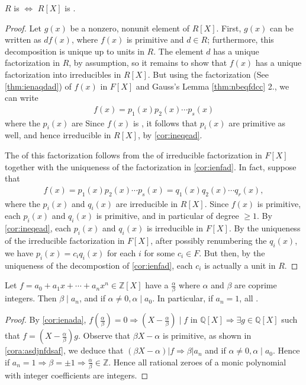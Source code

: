 \documentclass{article}
\begin{document}
\begin{thma}\label{thm:omeqdz}
$R$ is  $\Longleftrightarrow$ $R[X]$ is  .
\end{thma}
\begin{proof}
Let $g(x)$ be a nonzero, nonunit element of $R[X]$. First, $g(x)$ can be written as $d f(x)$, where $f(x)$ is primitive and $d \in R$; furthermore, this decomposition is unique up to units in $R$. The element $d$ has a unique factorization in $R$, by assumption, so it remains to show that $f(x)$ has a unique factorization into irreducibles in $R[X]$. But using the factorization (See \cref{thm:ienaqdad}) of $f(x)$ in $F[X]$ and Gauss's Lemma \cref{thm:nbeqfdcc} 2., we can write
\begin{align*}
f(x)=p_{1}(x) p_{2}(x) \cdots p_{s}(x)
\end{align*}
where the $p_{i}(x)$ are  Since $f(x)$ is , it follows that $p_{i}(x)$ are primitive as well, and hence irreducible in $R[X]$, by \cref{cor:ineqead}.

The  of this factorization follows from the  of irreducible factorization in $F[X]$ together with the uniqueness of the factorization in \cref{cor:ienfad}. In fact, suppose that
\begin{align*}
f(x)=p_{1}(x) p_{2}(x) \cdots p_{s}(x)=q_{1}(x) q_{2}(x) \cdots q_{r}(x),
\end{align*}
where the $p_{i}(x)$ and $q_{i}(x)$ are irreducible in $R[X]$. Since $f(x)$ is primitive, each $p_{i}(x)$ and $q_{i}(x)$ is primitive, and in particular of degree $\geq 1$. By \cref{cor:ineqead}, each $p_{i}(x)$ and $q_{i}(x)$ is irreducible in $F[X]$. By the uniqueness of the irreducible factorization in $F[X]$, after possibly renumbering the $q_{i}(x)$, we have $p_{i}(x)=c_{i} q_{i}(x)$ for each $i$ for some $c_{i} \in F$. But then, by the uniqueness of the decompostion of  \cref{cor:ienfad}, each $c_{i}$ is actually a unit in $R$.
\end{proof}

\begin{cora}\label{cor:ndaccd}
Let $f=a_{0}+a_{1} x+\cdots+a_{n} x^{n} \in \mathbb{Z}[X]$ have a  $\frac{\alpha}{\beta}$ where $\alpha$ and $\beta$ are coprime integers. Then $\beta \mid a_{n}$, and if $\alpha \neq 0, \alpha \mid a_{0}$. In particular, if $a_{n}=1$, all .
\end{cora}
\begin{proof}
By \cref{cor:ienada}, $f\left(\frac{\alpha}{\beta}\right)=0 \Rightarrow\left(X-\frac{\alpha}{\beta}\right) \mid f$ in $\mathbb{Q}[X] \Rightarrow \exists g \in \mathbb{Q}[X]$ such that $f=\left(X-\frac{\alpha}{\beta}\right) g$. Observe that $\beta X-\alpha$ is primitive, as shown in \cref{cora:asdjnfdsaf}, we deduce that $(\beta X-\alpha)|f \Rightarrow \beta| a_{n}$ and if $\alpha \neq 0, \alpha \mid a_{0}$. Hence if $a_{n}=1 \Rightarrow \beta= \pm 1 \Rightarrow \frac{\alpha}{\beta} \in \mathbb{Z}$.
Hence all rational zeroes of a monic polynomial with integer coefficients are integers.
\end{proof}
\end{document}
